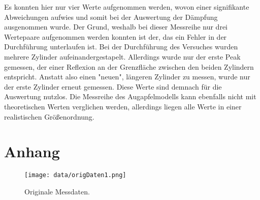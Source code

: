 Es konnten hier nur vier Werte aufgenommen werden, wovon einer signifikante Abweichungen aufwies und somit bei der Auswertung der Dämpfung ausgenommen wurde.
Der Grund, weshalb bei dieser Messreihe nur drei Wertepaare aufgenommen werden konnten ist der, das ein Fehler in der Durchführung unterlaufen ist.
Bei der Durchführung des Versuches wurden mehrere Zylinder aufeinandergestapelt. Allerdings wurde nur der erste Peak gemessen, der einer Reflexion an der Grenzfläche zwischen den beiden
Zylindern entspricht. Anstatt also einen "neuen", längeren Zylinder zu messen, wurde nur der erste Zylinder erneut gemessen. Diese Werte sind demnach für die Auswertung nutzlos. \newline
Die Messreihe des Augapfelmodells kann ebenfalls nicht mit theoretischen Werten verglichen werden, allerdings liegen alle Werte in einer realistischen Größenordnung.


\printbibliography{}

\section*{Anhang}
\label{sec:anhang}

\begin{figure}[H]
    \centering
    \texttt{[image: data/origDaten1.png]}
    \caption{Originale Messdaten.}
    \label{fig:origDaten1}
\end{figure}

